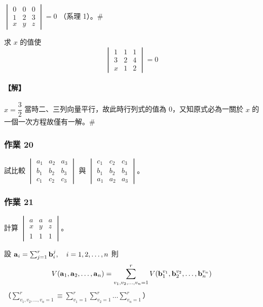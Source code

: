 \begin{example}\label{ex:b6s-1-17}
$\begin{vmatrix} 0 & 0 & 0 \\ 1 & 2 & 3 \\ x & y & z \end{vmatrix} = 0$ （系理 1）。\hfill$\#$
\end{example}

\begin{example}\label{ex:b6s-1-18}
求 $x$ 的值使
\[ \begin{vmatrix} 1 & 1 & 1 \\ 3 & 2 & 4 \\ x & 1 & 2 \end{vmatrix} = 0 \]
\end{example}

\paragraph{【解】}
$x = \dfrac{3}{2}$ 當時二、三列向量平行，故此時行列式的值為 0，又知原式必為一關於 $x$ 的一個一次方程故僅有一解。\hfill$\#$

\subsubsection*{作業 20}\label{hw:b6s-1-20}
試比較 $\begin{vmatrix} a_1 & a_2 & a_3 \\ b_1 & b_2 & b_3 \\ c_1 & c_2 & c_3 \end{vmatrix}$ 與 $\begin{vmatrix} c_1 & c_2 & c_3 \\ b_1 & b_2 & b_3 \\ a_1 & a_2 & a_3 \end{vmatrix}$。

\subsubsection*{作業 21}\label{hw:b6s-1-21}
計算 $\begin{vmatrix} a & a & a \\ x & y & z \\ 1 & 1 & 1 \end{vmatrix}$。

\begin{theorem}\label{thm:b6s-1-7}
設 $\boldsymbol{\mathbf{a}}_i = \sum_{j=1}^r \boldsymbol{\mathbf{b}}_i^j, \quad i=1, 2, \dots, n$
則
\[ V(\boldsymbol{\mathbf{a}}_1, \boldsymbol{\mathbf{a}}_2, \dots, \boldsymbol{\mathbf{a}}_n) = \sum_{v_1, v_2, \dots, v_n=1}^r V(\boldsymbol{\mathbf{b}}_1^{v_1}, \boldsymbol{\mathbf{b}}_2^{v_2}, \dots, \boldsymbol{\mathbf{b}}_n^{v_n}) \]
（$\sum_{v_1, v_2, \dots, v_n=1}^r \equiv \sum_{v_1=1}^r \sum_{v_2=1}^r \dots \sum_{v_n=1}^r$）
\end{theorem}

